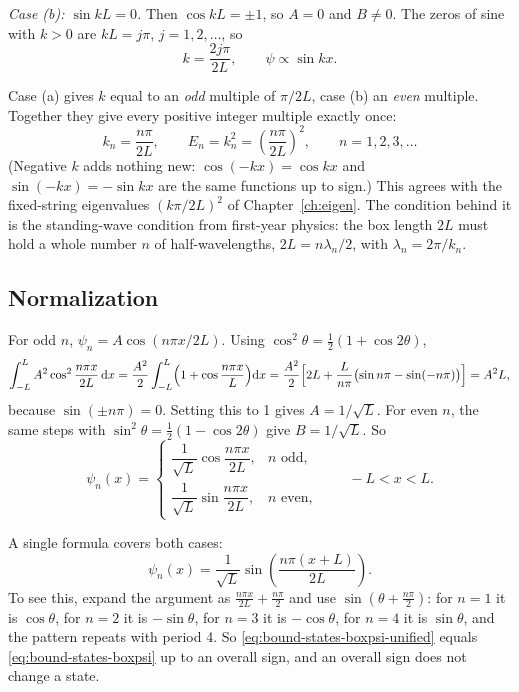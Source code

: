 \emph{Case (b): $\sin kL=0$.} Then $\cos kL=\pm1$, so $A=0$ and $B\ne0$. The zeros of sine with $k>0$ are $kL=j\pi$, $j=1,2,\dots$, so
\[
k=\frac{2j\pi}{2L},\qquad \psi\propto\sin kx .
\]

Case (a) gives $k$ equal to an \emph{odd} multiple of $\pi/2L$, case (b) an \emph{even} multiple. Together they give every positive integer multiple exactly once:
\begin{equation}
k_n=\frac{n\pi}{2L},\qquad E_n=k_n^2=\left(\frac{n\pi}{2L}\right)^2,\qquad n=1,2,3,\dots
\label{eq:bound-states-boxE}
\end{equation}
(Negative $k$ adds nothing new: $\cos(-kx)=\cos kx$ and $\sin(-kx)=-\sin kx$ are the same functions up to sign.) This agrees with the fixed-string eigenvalues $(k\pi/2L)^2$ of Chapter~\ref{ch:eigen}. The condition behind it is the standing-wave condition from first-year physics: the box length $2L$ must hold a whole number $n$ of half-wavelengths, $2L=n\lambda_n/2$, with $\lambda_n=2\pi/k_n$.

\subsection{Normalization}

For odd $n$, $\psi_n=A\cos(n\pi x/2L)$. Using $\cos^2\theta=\tfrac12(1+\cos2\theta)$,
\[
\int_{-L}^{L}A^2\cos^2\frac{n\pi x}{2L}\,\mathrm{d} x
=\frac{A^2}{2}\int_{-L}^{L}\Bigl(1+\cos\frac{n\pi x}{L}\Bigr)\mathrm{d} x
=\frac{A^2}{2}\Bigl[2L+\frac{L}{n\pi}\bigl(\sin n\pi-\sin(-n\pi)\bigr)\Bigr]=A^2L,
\]
because $\sin(\pm n\pi)=0$. Setting this to 1 gives $A=1/\sqrt L$. For even $n$, the same steps with $\sin^2\theta=\tfrac12(1-\cos2\theta)$ give $B=1/\sqrt L$. So
\begin{equation}
\psi_n(x)=\begin{cases}\dfrac{1}{\sqrt L}\cos\dfrac{n\pi x}{2L}, & n \text{ odd},\\[2ex]
\dfrac{1}{\sqrt L}\sin\dfrac{n\pi x}{2L}, & n\text{ even},\end{cases}
\qquad -L<x<L .
\label{eq:bound-states-boxpsi}
\end{equation}

A single formula covers both cases:
\begin{equation}
\psi_n(x)=\frac{1}{\sqrt L}\sin\!\left(\frac{n\pi(x+L)}{2L}\right).
\label{eq:bound-states-boxpsi-unified}
\end{equation}
To see this, expand the argument as $\frac{n\pi x}{2L}+\frac{n\pi}{2}$ and use $\sin(\theta+\tfrac{n\pi}{2})$: for $n=1$ it is $\cos\theta$, for $n=2$ it is $-\sin\theta$, for $n=3$ it is $-\cos\theta$, for $n=4$ it is $\sin\theta$, and the pattern repeats with period 4. So \cref{eq:bound-states-boxpsi-unified} equals \cref{eq:bound-states-boxpsi} up to an overall sign, and an overall sign does not change a state.

